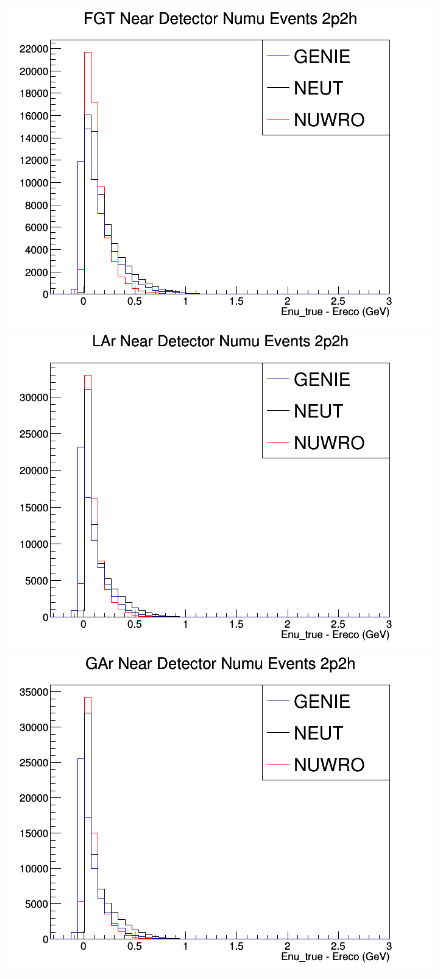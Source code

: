 \begin{figure}[h]
\endminipage
{}
\includegraphics[width=\linewidth]{Ereco_Etrue/numu_FGT_2p2h.png}
\endminipage
{}
\includegraphics[width=\linewidth]{Ereco_Etrue/numu_LAr_2p2h.png}
\endminipage
{}
\includegraphics[width=\linewidth]{Ereco_Etrue/numu_GAr_2p2h.png}

\end{figure}
